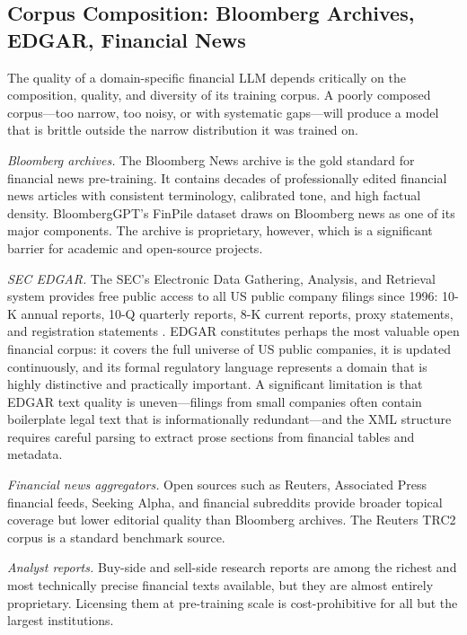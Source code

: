 \subsection{Corpus Composition: Bloomberg Archives, EDGAR, Financial News}
\label{sec:ch08-corpus-composition}

The quality of a domain-specific financial LLM depends critically on the
composition, quality, and diversity of its training corpus.  A poorly composed
corpus---too narrow, too noisy, or with systematic gaps---will produce a model
that is brittle outside the narrow distribution it was trained on.

\textit{Bloomberg archives.}  The Bloomberg News archive is the gold standard
for financial news pre-training.  It contains decades of professionally edited
financial news articles with consistent terminology, calibrated tone, and high
factual density.  BloombergGPT's FinPile dataset \cite{wu2023bloomberggpt} draws
on Bloomberg news as one of its major components.  The archive is proprietary,
however, which is a significant barrier for academic and open-source projects.

\textit{SEC EDGAR.}  The SEC's Electronic Data Gathering, Analysis, and Retrieval
system provides free public access to all US public company filings since 1996:
10-K annual reports, 10-Q quarterly reports, 8-K current reports, proxy statements,
and registration statements \cite{sec2009xbrl}.  EDGAR constitutes perhaps the most
valuable open financial corpus: it covers the full universe of US public companies,
it is updated continuously, and its formal regulatory language represents a domain
that is highly distinctive and practically important.  A significant limitation is
that EDGAR text quality is uneven---filings from small companies often contain
boilerplate legal text that is informationally redundant---and the XML structure
requires careful parsing to extract prose sections from financial tables and
metadata.

\textit{Financial news aggregators.}  Open sources such as Reuters, Associated
Press financial feeds, Seeking Alpha, and financial subreddits provide broader
topical coverage but lower editorial quality than Bloomberg archives.  The
Reuters TRC2 corpus \cite{araci2019finbert} is a standard benchmark source.

\textit{Analyst reports.}  Buy-side and sell-side research reports are among the
richest and most technically precise financial texts available, but they are
almost entirely proprietary.  Licensing them at pre-training scale is cost-prohibitive
for all but the largest institutions.

